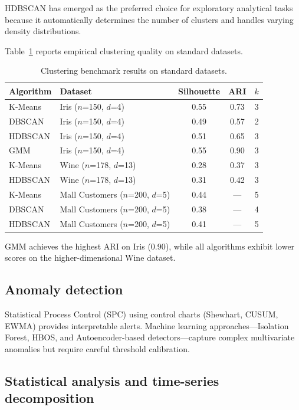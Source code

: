 \documentclass[preprint,12pt,authoryear]{elsarticle}
\theoremstyle{definition}
\begin{document}
HDBSCAN has emerged as the preferred choice for exploratory analytical tasks because it automatically determines the number of clusters and handles varying density distributions.

Table~\ref{tab:clustering-benchmarks} reports empirical clustering quality on standard datasets.

\begin{table}[ht]
\centering
\caption{Clustering benchmark results on standard datasets.}
\label{tab:clustering-benchmarks}
\begin{tabular}{llccr}
\toprule
\textbf{Algorithm} & \textbf{Dataset} & \textbf{Silhouette} & \textbf{ARI} & \textbf{$k$} \\
\midrule
K-Means & Iris ($n$=150, $d$=4)           & 0.55 & 0.73 & 3 \\
DBSCAN  & Iris ($n$=150, $d$=4)           & 0.49 & 0.57 & 2 \\
HDBSCAN & Iris ($n$=150, $d$=4)           & 0.51 & 0.65 & 3 \\
GMM     & Iris ($n$=150, $d$=4)           & 0.55 & 0.90 & 3 \\
\midrule
K-Means & Wine ($n$=178, $d$=13)          & 0.28 & 0.37 & 3 \\
HDBSCAN & Wine ($n$=178, $d$=13)          & 0.31 & 0.42 & 3 \\
\midrule
K-Means & Mall Customers ($n$=200, $d$=5) & 0.44 & ---  & 5 \\
DBSCAN  & Mall Customers ($n$=200, $d$=5) & 0.38 & ---  & 4 \\
HDBSCAN & Mall Customers ($n$=200, $d$=5) & 0.41 & ---  & 5 \\
\bottomrule
\end{tabular}
\end{table}

GMM achieves the highest ARI on Iris (0.90), while all algorithms exhibit lower scores on the higher-dimensional Wine dataset.

\subsection{Anomaly detection}

Statistical Process Control (SPC) using control charts (Shewhart, CUSUM, EWMA) provides interpretable alerts. Machine learning approaches---Isolation Forest, HBOS, and Autoencoder-based detectors---capture complex multivariate anomalies but require careful threshold calibration.

\subsection{Statistical analysis and time-series decomposition}
\end{document}
